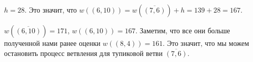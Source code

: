 $h = 28$. Это значит, что $w((6, 10)) = w(\overline{(7, 6)}) + h = 139 + 28 = 167$.

$w(\overline{(6, 10)}) = 171$, $w((6, 10)) = 167$. Заметим, что все они больше полученной нами ранее оценки $w((8, 4)) = 161$. Это значит, что мы можем остановить процесс ветвления для тупиковой ветви $\overline{(7, 6)}$.

\begin{tikzpicture}[
                grow=east, %
                level 1/.style = {level distance=1.70cm}, %
                edge from parent/.style = {draw, -latex},
                kant/.style={text width=2cm, text centered, sloped, font=\scriptsize},
                cell/.style={circle, draw, align=center, font=\scriptsize}, %
        ]


\end{tikzpicture}
